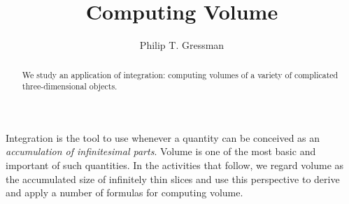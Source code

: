 \documentclass{ximera}
\title{Computing Volume}
\author{Philip T. Gressman}
\begin{document}
\begin{abstract}
  We study an application of integration: computing volumes of a variety of complicated three-dimensional objects.
\end{abstract}
\maketitle

Integration is the tool to use whenever a quantity can be conceived as an \textit{accumulation of infinitesimal parts}. 
Volume is one of the most basic and important of such quantities. In the activities that follow, we regard volume as the accumulated size of infinitely thin slices and use this perspective to derive and apply a number of formulas for computing volume.
\end{document}
